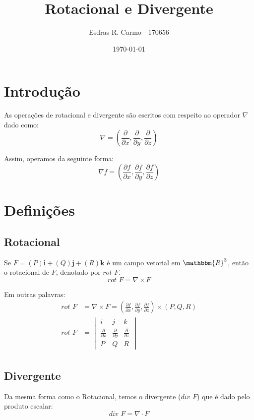 \documentclass{article}
\author{Esdras R. Carmo - 170656}
\title{Rotacional e Divergente}
\date{\today}
\newcommand{\REAL}{\mathbbm{R}}
\newcommand{\PartialDer}[2] {\frac{\partial #1}{\partial #2}}
\newcommand{\FVett}[3] {\left(#1\right) \textbf{i} + \left(#2\right) \textbf{j} + \left(#3\right) \textbf {k}}
\newcommand{\Rot}[0] {\textit{rot }}
\newcommand{\Div}[0] {\textit{div }}
\begin{document}
    \maketitle

    \section{Introdução}
        As operações de rotacional e divergente são escritos com respeito ao operador
        $\nabla$ dado como:
        \[
            \nabla = \left(\PartialDer{}{x}, \PartialDer{}{y}, \PartialDer{}{z}\right)
        \]

        Assim, operamos da seguinte forma:
        \[
            \nabla f = \left(\PartialDer{f}{x}, \PartialDer{f}{y}, \PartialDer{f}{z}\right)
        \]

    \section{Definições}
        \subsection{Rotacional}
            Se $F = \FVett{P}{Q}{R}$ é um campo vetorial em $\REAL^3$, então o rotacional de $F$, denotado
            por $\Rot F$.
            \[
                \Rot F = \nabla \times F
            \]

            Em outras palavras:
            \begin{align*}
                \Rot F &= \nabla \times F = \left(\PartialDer{f}{x}, \PartialDer{f}{y}, \PartialDer{f}{z}\right) \times (P, Q, R)\\
                \Rot F &= \begin{vmatrix}
                            i&j&k\\
                            \PartialDer{}{x}&\PartialDer{}{y}&\PartialDer{}{z}\\
                            P&Q&R\end{vmatrix}\\
            \end{align*}

        \subsection{Divergente}
            Da mesma forma como o Rotacional, temos o divergente ($\Div F$) que é dado pelo produto escalar:
            \[
                \Div F = \nabla \cdot F
            \]
\end{document}
